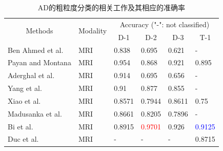 \begin{table}[ht]
\centering
\caption{AD的粗粒度分类的相关工作及其相应的准确率}\label{paper3accuracy1}
\footnotesize
\begin{tabular}{p{3.7cm}<{\centering}|p{1.8cm}<{\centering}|p{1.35cm}<{\centering}|p{1.35cm}<{\centering}|p{1.35cm}<{\centering}|p{1.35cm}<{\centering}}
\hline
\multicolumn{1}{c|}{\multirow{2}{*}{ Methods }}
& \multicolumn{1}{c|}{\multirow{2}{*}{Modality}}
& \multicolumn{4}{c}{Accuracy ("-": not classified)}
\\ \cline{3-6}
\multicolumn{1}{c|}{}                         & \multicolumn{1}{c|}{}                       & \multicolumn{1}{c|}{ D-1 } & \multicolumn{1}{c|}{ D-2 } & \multicolumn{1}{c|}{ D-3 } & \multicolumn{1}{c}{T-1} \\ \hline
Ben Ahmed et al. \cite{ahmed2015alzheimer} & MRI  & 0.838 & 0.695 & 0.621 & - \\

Payan and Montana \cite{payan2015predicting} & MRI  & 0.954 & 0.868 & 0.921 & 0.895 \\

Aderghal et al. \cite{aderghal2017classification}          & MRI & 0.914 & 0.695 & 0.656  & -  \\
Yang et al. \cite{yang2017active}  & MRI  & 0.91  & 0.877 & 0.855  & -  \\
Xiao et al. \cite{xiao2017brain}    & MRI & 0.8571 & 0.7944 &0.8611 & 0.75 \\
Madusanka et al. \cite{madusanka2019alzheimer}              & MRI & 0.8661  & 0.8205 & 0.7896 & - \\
Bi et al. \cite{bi2020computer}    & MRI  & 0.8915  & \textcolor{red}{{0.9701}} & 0.926  & \textcolor{blue}{{0.9125}} \\
Duc et al. \cite{duc20203d}         & MRI & - & -  & - & 0.8715\\


\end{tabular}
\end{table}
